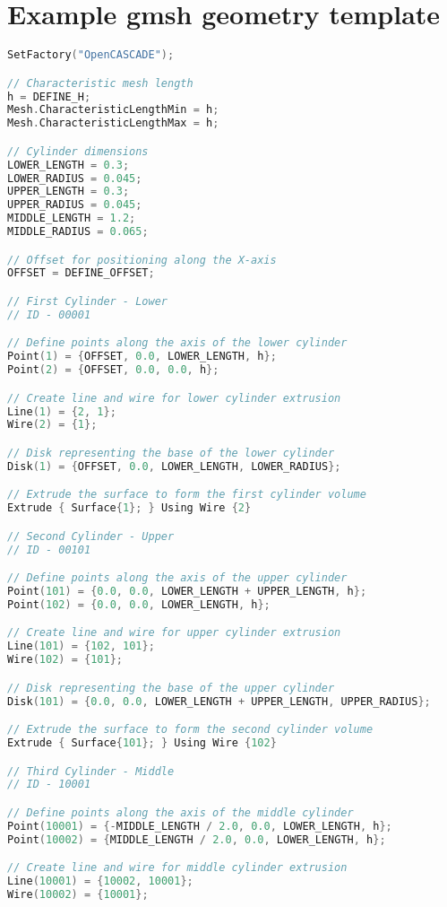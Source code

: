 \chapter{Example gmsh geometry template}\label{appendix A}

\begin{lstlisting}[language=C++]
SetFactory("OpenCASCADE");

// Characteristic mesh length
h = DEFINE_H;
Mesh.CharacteristicLengthMin = h;
Mesh.CharacteristicLengthMax = h;

// Cylinder dimensions
LOWER_LENGTH = 0.3;
LOWER_RADIUS = 0.045;
UPPER_LENGTH = 0.3;
UPPER_RADIUS = 0.045;
MIDDLE_LENGTH = 1.2;
MIDDLE_RADIUS = 0.065;

// Offset for positioning along the X-axis
OFFSET = DEFINE_OFFSET;

// First Cylinder - Lower 
// ID - 00001 

// Define points along the axis of the lower cylinder
Point(1) = {OFFSET, 0.0, LOWER_LENGTH, h};
Point(2) = {OFFSET, 0.0, 0.0, h};

// Create line and wire for lower cylinder extrusion
Line(1) = {2, 1};
Wire(2) = {1};

// Disk representing the base of the lower cylinder
Disk(1) = {OFFSET, 0.0, LOWER_LENGTH, LOWER_RADIUS};

// Extrude the surface to form the first cylinder volume
Extrude { Surface{1}; } Using Wire {2}

// Second Cylinder - Upper
// ID - 00101

// Define points along the axis of the upper cylinder
Point(101) = {0.0, 0.0, LOWER_LENGTH + UPPER_LENGTH, h};
Point(102) = {0.0, 0.0, LOWER_LENGTH, h};

// Create line and wire for upper cylinder extrusion
Line(101) = {102, 101};
Wire(102) = {101};

// Disk representing the base of the upper cylinder
Disk(101) = {0.0, 0.0, LOWER_LENGTH + UPPER_LENGTH, UPPER_RADIUS};

// Extrude the surface to form the second cylinder volume
Extrude { Surface{101}; } Using Wire {102}

// Third Cylinder - Middle
// ID - 10001

// Define points along the axis of the middle cylinder
Point(10001) = {-MIDDLE_LENGTH / 2.0, 0.0, LOWER_LENGTH, h};
Point(10002) = {MIDDLE_LENGTH / 2.0, 0.0, LOWER_LENGTH, h};

// Create line and wire for middle cylinder extrusion
Line(10001) = {10002, 10001};
Wire(10002) = {10001};


\end{lstlisting}
